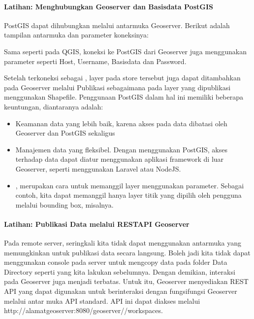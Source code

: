 \documentclass[letterpaper,10pt,english]{sphinxmanual}
\begin{document}
\paragraph{Latihan: Menghubungkan Geoserver dan Basisdata PostGIS}
\label{\detokenize{sesi3/publikasi:latihan-menghubungkan-geoserver-dan-basisdata-postgis}}
PostGIS dapat dihubungkan melalui antarmuka Geoserver. Berikut adalah tampilan antarmuka dan parameter koneksinya:


Sama seperti pada QGIS, koneksi ke PostGIS dari Geoserver juga menggunakan parameter seperti Host, Username, Basisdata dan Password.

Setelah terkoneksi sebagai , layer pada store tersebut juga dapat ditambahkan pada Geoserver melalui Publikasi sebagaimana pada layer yang dipublikasi menggunakan Shapefile. Penggunaan PostGIS dalam hal ini memiliki beberapa keuntungan, diantaranya adalah:
\begin{itemize}
\item {} 
Keamanan data yang lebih baik, karena akses pada data dibatasi oleh Geoserver dan PostGIS sekaligus

\item {} 
Manajemen data yang fleksibel. Dengan menggunakan PostGIS, akses terhadap data dapat diatur menggunakan aplikasi framework di luar Geoserver, seperti menggunakan Laravel atau NodeJS.

\item {} 
, merupakan cara untuk memanggil layer menggunakan parameter. Sebagai contoh, kita dapat memanggil hanya layer titik yang dipilih oleh pengguna melalui bounding box, misalnya.

\end{itemize}


\paragraph{Latihan: Publikasi Data melalui REST\sphinxhyphen{}API Geoserver}
\label{\detokenize{sesi3/publikasi:latihan-publikasi-data-melalui-rest-api-geoserver}}
Pada remote server, seringkali kita tidak dapat menggunakan antarmuka yang memungkinkan untuk publikasi data secara langsung. Boleh jadi kita tidak dapat menggunakan console pada server untuk mengcopy data pada folder Data Directory seperti yang kita lakukan sebelumnya. Dengan demikian, interaksi pada Geoserver juga menjadi terbatas. Untuk itu, Geoserver menyediakan REST API yang dapat digunakan untuk berinteraksi dengan fungsi\sphinxhyphen{}fungsi Geoserver melalui antar muka API standard. API ini dapat diakses melalui http://alamatgeoserver:8080/geoserver//workspaces.
\end{document}
